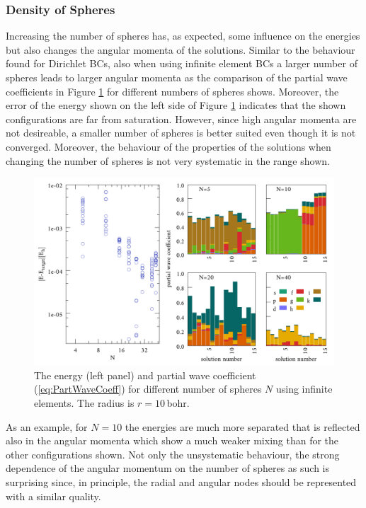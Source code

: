 \subsubsection{Density of Spheres}
\label{sec:BenchSphere}
Increasing the number of spheres has, as expected, some influence on the energies but also changes the angular momenta of the solutions.
Similar to the behaviour found for Dirichlet BCs, also when using infinite element BCs a larger number of spheres leads to larger angular momenta as the comparison of the partial wave coefficients in Figure \ref{fig:InfNum} for different numbers of spheres shows.
Moreover, the error of the energy shown on the left side of Figure \ref{fig:InfNum} indicates that the shown configurations are far from saturation.
However, since high angular momenta are not desireable, a smaller number of spheres is better suited even though it is not converged.
Moreover, the behaviour of the properties of the solutions when changing the number of spheres is not very systematic in the range shown.
\begin{figure}
\includegraphics[width=\textwidth]{Figures/BC/NumInfEL}
\caption{The energy (left panel) and partial wave coefficient (\ref{eq:PartWaveCoeff}) for different number of spheres $N$ using infinite elements. The radius is $r=10\,$bohr.}
\label{fig:InfNum}
\end{figure}
As an example, for $N=10$ the energies are much more separated that is reflected also in the angular momenta which show a much weaker mixing than for the other configurations shown.
Not only the unsystematic behaviour, the strong dependence of the angular momentum on the number of spheres as such is surprising since, in principle, the radial and angular nodes should be represented with a similar quality.

